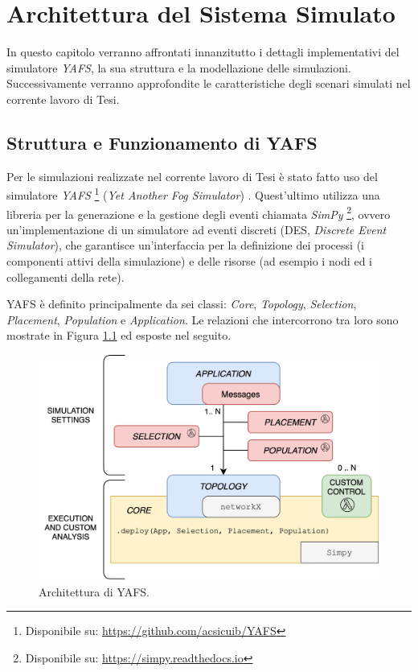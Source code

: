 \chapter{Architettura del Sistema Simulato}	
\label{chapter:architettura}

In questo capitolo verranno affrontati innanzitutto i dettagli implementativi del simulatore \textit{YAFS}, la sua struttura e la modellazione delle simulazioni. Successivamente verranno approfondite le caratteristiche degli scenari simulati nel corrente lavoro di Tesi.

\section{Struttura e Funzionamento di YAFS}

Per le simulazioni realizzate nel corrente lavoro di Tesi è stato fatto uso del simulatore \textit{YAFS} \footnote{Disponibile su: \url{https://github.com/acsicuib/YAFS}} (\textit{Yet Another Fog Simulator}) \cite{YAFSSimulator}. Quest'ultimo utilizza una libreria per la generazione e la gestione degli eventi chiamata \textit{SimPy} \footnote{Disponibile su: \url{https://simpy.readthedocs.io}}, ovvero un'implementazione di un simulatore ad eventi discreti (DES, \textit{Discrete Event Simulator}), che garantisce un'interfaccia per la definizione dei processi (i componenti attivi della simulazione) e delle risorse (ad esempio i nodi ed i collegamenti della rete).

YAFS è definito principalmente da sei classi: \textit{Core}, \textit{Topology}, \textit{Selection}, \textit{Placement}, \textit{Population} e \textit{Application}. Le relazioni che intercorrono tra loro sono mostrate in Figura \ref{fig:YAFS_classes} ed esposte nel seguito.

\begin{figure}[!ht]
  \includegraphics[width=12cm]{images/YAFS_classes}
  \centering
  \caption[Architettura di YAFS]{Architettura di YAFS.\cite{YAFSSimulator}}
  \label{fig:YAFS_classes}
\end{figure}

